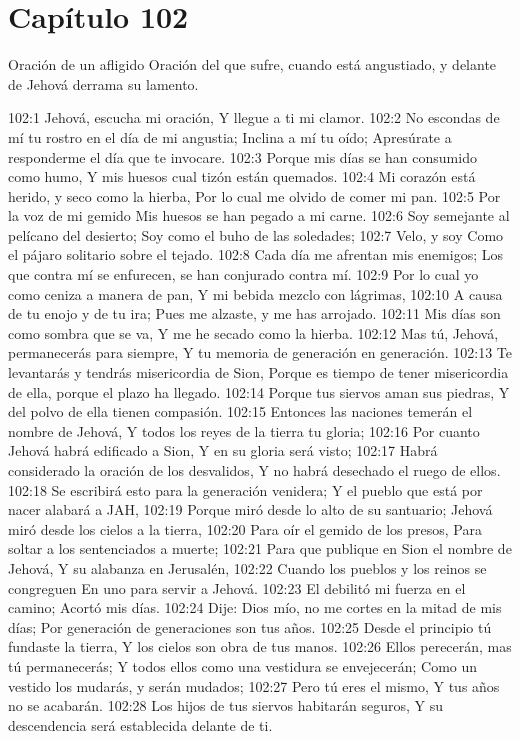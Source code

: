 \section*{Capítulo 102}
Oración de un afligido 
Oración del que sufre, cuando está angustiado, y delante de Jehová derrama su lamento. 
 
102:1 Jehová, escucha mi oración, 
Y llegue a ti mi clamor. 
102:2 No escondas de mí tu rostro en el día de mi angustia; 
Inclina a mí tu oído; 
Apresúrate a responderme el día que te invocare. 
102:3 Porque mis días se han consumido como humo, 
Y mis huesos cual tizón están quemados. 
102:4 Mi corazón está herido, y seco como la hierba, 
Por lo cual me olvido de comer mi pan. 
102:5 Por la voz de mi gemido 
Mis huesos se han pegado a mi carne. 
102:6 Soy semejante al pelícano del desierto; 
Soy como el buho de las soledades; 
102:7 Velo, y soy 
Como el pájaro solitario sobre el tejado. 
102:8 Cada día me afrentan mis enemigos; 
Los que contra mí se enfurecen, se han conjurado contra mí. 
102:9 Por lo cual yo como ceniza a manera de pan, 
Y mi bebida mezclo con lágrimas, 
102:10 A causa de tu enojo y de tu ira; 
Pues me alzaste, y me has arrojado. 
102:11 Mis días son como sombra que se va, 
Y me he secado como la hierba. 
102:12 Mas tú, Jehová, permanecerás para siempre, 
Y tu memoria de generación en generación. 
102:13 Te levantarás y tendrás misericordia de Sion, 
Porque es tiempo de tener misericordia de ella, porque el plazo ha llegado. 
102:14 Porque tus siervos aman sus piedras, 
Y del polvo de ella tienen compasión. 
102:15 Entonces las naciones temerán el nombre de Jehová, 
Y todos los reyes de la tierra tu gloria; 
102:16 Por cuanto Jehová habrá edificado a Sion, 
Y en su gloria será visto; 
102:17 Habrá considerado la oración de los desvalidos, 
Y no habrá desechado el ruego de ellos. 
102:18 Se escribirá esto para la generación venidera; 
Y el pueblo que está por nacer alabará a JAH, 
102:19 Porque miró desde lo alto de su santuario; 
Jehová miró desde los cielos a la tierra, 
102:20 Para oír el gemido de los presos, 
Para soltar a los sentenciados a muerte; 
102:21 Para que publique en Sion el nombre de Jehová, 
Y su alabanza en Jerusalén, 
102:22 Cuando los pueblos y los reinos se congreguen 
En uno para servir a Jehová. 
102:23 El debilitó mi fuerza en el camino; 
Acortó mis días. 
102:24 Dije: Dios mío, no me cortes en la mitad de mis días; 
Por generación de generaciones son tus años. 
102:25 Desde el principio tú fundaste la tierra, 
Y los cielos son obra de tus manos. 
102:26 Ellos perecerán, mas tú permanecerás; 
Y todos ellos como una vestidura se envejecerán; 
Como un vestido los mudarás, y serán mudados; 
102:27 Pero tú eres el mismo, 
Y tus años no se acabarán. 
102:28 Los hijos de tus siervos habitarán seguros, 
Y su descendencia será establecida delante de ti. 
